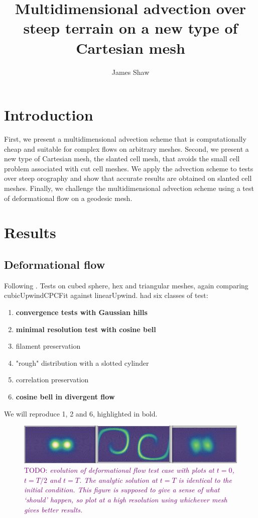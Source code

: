 \documentclass{article}
\title{Multidimensional advection over steep terrain on a new type of Cartesian mesh \\ \TODO{(working title)}}
\author{James Shaw}
\newcommand{\TODO}[1]{\textcolor{purple}{TODO: \emph{#1}}}
\begin{document}
\maketitle

\section{Introduction}

First, we present a multidimensional advection scheme that is computationally cheap and suitable for complex flows on arbitrary meshes.  Second, we present a new type of Cartesian mesh, the slanted cell mesh, that avoids the small cell problem associated with cut cell meshes.   We apply the advection scheme to tests over steep orography and show that accurate results are obtained on slanted cell meshes.  Finally, we challenge the multidimensional advection scheme using a test of deformational flow on a geodesic mesh.





\section{Results}

\subsection{Deformational flow}
Following \citep{lauritzen2012}.  Tests on cubed sphere, hex and triangular meshes, again comparing cubicUpwindCPCFit against linearUpwind.  \citet{lauritzen2012} had six classes of test:
\begin{enumerate}
	\item \textbf{convergence tests with Gaussian hills}
	\item \textbf{minimal resolution test with cosine bell}
	\item filament preservation
	\item "rough" distribution with a slotted cylinder
	\item correlation preservation
	\item \textbf{cosine bell in divergent flow}
\end{enumerate}
We will reproduce 1, 2 and 6, highlighted in bold.

\begin{figure}
	\includegraphics[width=\textwidth]{hexCubUpEvolution.png}
	\caption{\TODO{evolution of deformational flow test case with plots at $t=0$, $t=T/2$ and $t=T$.  The analytic solution at $t=T$ is identical to the initial condition.  This figure is supposed to give a sense of what `should' happen, so plot at a high resolution using whichever mesh gives better results.}}
\end{figure}
\end{document}
